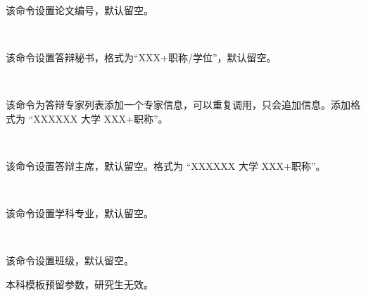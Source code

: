 \documentclass{ctxdoc}
\begin{document}
    \begin{function}[added=2024-08-18]{\paperno}
        \begin{syntax}
             \\
        \end{syntax}
        该命令设置论文编号，默认留空。
    \end{function}


    \begin{function}[added=2024-08-18]{}
        \begin{syntax}
             \\
        \end{syntax}
        该命令设置答辩秘书，格式为“XXX+职称/学位”，默认留空。
    \end{function}


    \begin{function}[added=2024-08-18]{\addexpert}
        \begin{syntax}
             \\
        \end{syntax}
        该命令为答辩专家列表添加一个专家信息，可以重复调用，只会追加信息。添加格式为 “XXXXXX 大学 XXX+职称”。
    \end{function}


    \begin{function}[added=2024-08-18]{\chairman}
        \begin{syntax}
             \
        \end{syntax}
        该命令设置答辩主席，默认留空。格式为 “XXXXXX 大学 XXX+职称”。
    \end{function}


    \begin{function}[added=2024-08-18]{\major}
        \begin{syntax}
             \\
        \end{syntax}
        该命令设置学科专业，默认留空。
    \end{function}


    \begin{function}[added=2024-08-18]{\class}
        \begin{syntax}
             \\
        \end{syntax}
        该命令设置班级，默认留空。
        \begin{texnote}
            本科模板预留参数，研究生无效。
        \end{texnote}
    \end{function}
\end{document}
